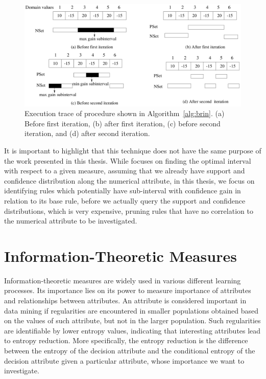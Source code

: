 \begin{figure}
\label{fig:optgain}
\begin{center}
  \includegraphics[width=1\linewidth]{./Figures/optgain1d.png}
\end{center}
\caption{Execution trace of procedure shown in Algorithm~\ref{alg:brin}. (a) Before first iteration, (b) after first
iteration, (c) before second iteration, and (d) after second iteration\cite{Brin99miningoptimized}.}
\end{figure}

It is important to highlight that this technique does not have the same purpose of the work presented in this thesis.
While \cite{Brin99miningoptimized} focuses on finding the optimal interval with respect to a given measure, assuming
that we already have support and confidence distribution along the numerical attribute, in this thesis, we focus on
identifying rules which potentially have sub-interval with confidence gain in relation to its base rule, before we
actually query the support and confidence distributions, which is very expensive, pruning rules that have no
correlation to the numerical attribute to be investigated. 

\section{Information-Theoretic Measures}
\label{sec:rw-infotheoreticmeasures}

Information-theoretic measures are widely used in various different learning processes. Its importance lies on its
power
to measure importance of attributes and relationships between attributes. An attribute is considered important in data
mining if regularities are encountered in smaller populations obtained based on the values of such attribute, but not
in
the larger population. Such regularities are identifiable by lower entropy values, indicating that interesting
attributes lead to entropy reduction. More specifically, the entropy reduction is the difference between the entropy
of
the decision attribute and the conditional entropy of the decision attribute given a particular attribute, whose
importance we want to investigate.

